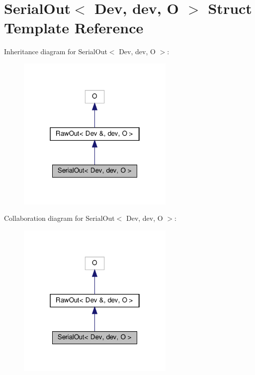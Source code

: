 \hypertarget{structSerialOut}{}\section{Serial\+Out$<$ Dev, dev, O $>$ Struct Template Reference}
\label{structSerialOut}


Inheritance diagram for Serial\+Out$<$ Dev, dev, O $>$\+:\nopagebreak
\begin{figure}[H]
\begin{center}
\leavevmode
\includegraphics[width=214pt]{structSerialOut__inherit__graph}
\end{center}
\end{figure}


Collaboration diagram for Serial\+Out$<$ Dev, dev, O $>$\+:\nopagebreak
\begin{figure}[H]
\begin{center}
\leavevmode
\includegraphics[width=214pt]{structSerialOut__coll__graph}
\end{center}
\end{figure}
